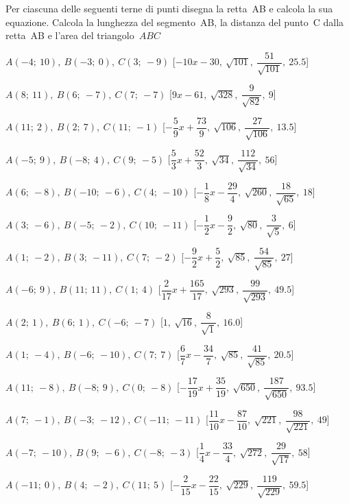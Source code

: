 \begin{esercizio}\label{ese:}
 Per ciascuna delle seguenti terne di 
punti disegna la retta~AB e calcola la sua equazione. 
Calcola la lunghezza del segmento~AB, la distanza del punto~C dalla retta~AB 
e l'area del triangolo~$ABC$
 \begin{enumeratea}
  \item  $A(-4;~10),~B(-3;~0),~C(3;~-9)$ \hfill 
   [$-10 x -30,~\sqrt{101},~\dfrac{51}{\sqrt{101}},~25.5$]
  \item  $A(8;~11),~B(6;~-7),~C(7;~-7)$ \hfill 
   [$9 x -61,~\sqrt{328},~\dfrac{9}{\sqrt{82}},~9$]
  \item  $A(11;~2),~B(2;~7),~C(11;~-1)$ \hfill 
   [$-\dfrac{5}{9} x +\dfrac{73}{9},~\sqrt{106},~\dfrac{27}{\sqrt{106}},~13.5$]
  \item  $A(-5;~9),~B(-8;~4),~C(9;~-5)$ \hfill 
   [$\dfrac{5}{3} x +\dfrac{52}{3},~\sqrt{34},~\dfrac{112}{\sqrt{34}},~56$]
  \item  $A(6;~-8),~B(-10;~-6),~C(4;~-10)$ \hfill 
   [$-\dfrac{1}{8} x -\dfrac{29}{4},~\sqrt{260},~\dfrac{18}{\sqrt{65}},~18$]
  \item  $A(3;~-6),~B(-5;~-2),~C(10;~-11)$ \hfill 
   [$-\dfrac{1}{2} x -\dfrac{9}{2},~\sqrt{80},~\dfrac{3}{\sqrt{5}},~6$]
  \item  $A(1;~-2),~B(3;~-11),~C(7;~-2)$ \hfill 
   [$-\dfrac{9}{2} x +\dfrac{5}{2},~\sqrt{85},~\dfrac{54}{\sqrt{85}},~27$]
  \item  $A(-6;~9),~B(11;~11),~C(1;~4)$ \hfill 
   [$\dfrac{2}{17} x 
+\dfrac{165}{17},~\sqrt{293},~\dfrac{99}{\sqrt{293}},~49.5$]
  \item  $A(2;~1),~B(6;~1),~C(-6;~-7)$ \hfill 
   [$1,~\sqrt{16},~\dfrac{8}{\sqrt{1}},~16.0$]
  \item  $A(1;~-4),~B(-6;~-10),~C(7;~7)$ \hfill 
   [$\dfrac{6}{7} x -\dfrac{34}{7},~\sqrt{85},~\dfrac{41}{\sqrt{85}},~20.5$]
  \item  $A(11;~-8),~B(-8;~9),~C(0;~-8)$ \hfill 
   [$-\dfrac{17}{19} x 
+\dfrac{35}{19},~\sqrt{650},~\dfrac{187}{\sqrt{650}},~93.5$]
  \item  $A(7;~-1),~B(-3;~-12),~C(-11;~-11)$ \hfill 
   [$\dfrac{11}{10} x -\dfrac{87}{10},~\sqrt{221},~\dfrac{98}{\sqrt{221}},~49$]
  \item  $A(-7;~-10),~B(9;~-6),~C(-8;~-3)$ \hfill 
   [$\dfrac{1}{4} x -\dfrac{33}{4},~\sqrt{272},~\dfrac{29}{\sqrt{17}},~58$]
  \item  $A(-11;~0),~B(4;~-2),~C(11;~5)$ \hfill 
   [$-\dfrac{2}{15} x 
-\dfrac{22}{15},~\sqrt{229},~\dfrac{119}{\sqrt{229}},~59.5$]

\end{enumeratea}
\end{esercizio}
